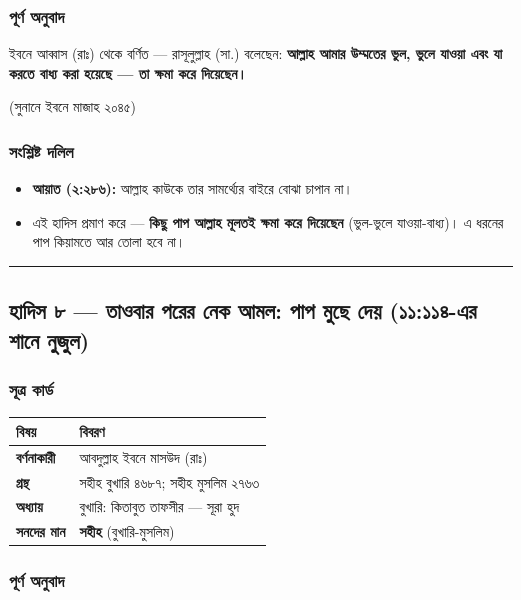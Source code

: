 \subsubsection*{পূর্ণ অনুবাদ}

ইবনে আব্বাস (রাঃ) থেকে বর্ণিত — রাসূলুল্লাহ (সা.) বলেছেন: \textbf{আল্লাহ আমার উম্মতের ভুল, ভুলে যাওয়া এবং যা করতে বাধ্য করা হয়েছে — তা ক্ষমা করে দিয়েছেন।}

(সুনানে ইবনে মাজাহ ২০৪৫)

\subsubsection*{সংশ্লিষ্ট দলিল}

\begin{itemize}
\item \textbf{আয়াত (২:২৮৬):} আল্লাহ কাউকে তার সামর্থ্যের বাইরে বোঝা চাপান না।
\item এই হাদিস প্রমাণ করে — \textbf{কিছু পাপ আল্লাহ মূলতই ক্ষমা করে দিয়েছেন} (ভুল-ভুলে যাওয়া-বাধ্য)। এ ধরনের পাপ কিয়ামতে আর তোলা হবে না।
\end{itemize}
\medskip\hrule\medskip

\subsection*{হাদিস ৮ — তাওবার পরের নেক আমল: পাপ মুছে দেয় (১১:১১৪-এর শানে নুজুল)}

\subsubsection*{সূত্র কার্ড}

\begin{table}[h]\centering\small
\begin{tabular}{ll}
বিষয় & বিবরণ \\
\hline
\textbf{বর্ণনাকারী} & আবদুল্লাহ ইবনে মাসউদ (রাঃ) \\
\textbf{গ্রন্থ} & সহীহ বুখারি ৪৬৮৭; সহীহ মুসলিম ২৭৬৩ \\
\textbf{অধ্যায়} & বুখারি: কিতাবুত তাফসীর — সূরা হুদ \\
\textbf{সনদের মান} & \textbf{সহীহ} (বুখারি-মুসলিম) \\
\hline
\end{tabular}
\end{table}

\subsubsection*{পূর্ণ অনুবাদ}

